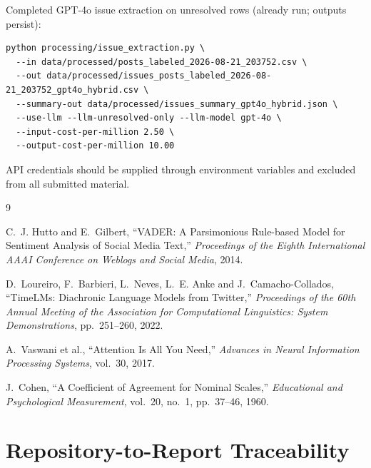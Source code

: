 \documentclass[11pt,a4paper]{article}
\begin{document}
Completed GPT-4o issue extraction on unresolved rows (already run; outputs persist):

\begin{verbatim}
python processing/issue_extraction.py \
  --in data/processed/posts_labeled_2026-08-21_203752.csv \
  --out data/processed/issues_posts_labeled_2026-08-21_203752_gpt4o_hybrid.csv \
  --summary-out data/processed/issues_summary_gpt4o_hybrid.json \
  --use-llm --llm-unresolved-only --llm-model gpt-4o \
  --input-cost-per-million 2.50 \
  --output-cost-per-million 10.00
\end{verbatim}

API credentials should be supplied through environment variables and excluded from all submitted material.

\begin{thebibliography}{9}

C.~J. Hutto and E.~Gilbert,
``VADER: A Parsimonious Rule-based Model for Sentiment Analysis of Social Media Text,''
\textit{Proceedings of the Eighth International AAAI Conference on Weblogs and Social Media},
2014.

D.~Loureiro, F.~Barbieri, L.~Neves, L.~E. Anke and J.~Camacho-Collados,
``TimeLMs: Diachronic Language Models from Twitter,''
\textit{Proceedings of the 60th Annual Meeting of the Association for Computational Linguistics: System Demonstrations},
pp.~251--260, 2022.

\bibitem{vaswani2017attention}
A.~Vaswani et al.,
``Attention Is All You Need,''
\textit{Advances in Neural Information Processing Systems}, vol.~30, 2017.

J.~Cohen,
``A Coefficient of Agreement for Nominal Scales,''
\textit{Educational and Psychological Measurement}, vol.~20, no.~1, pp.~37--46, 1960.

\end{thebibliography}

\appendix
\section{Repository-to-Report Traceability}
\end{document}
